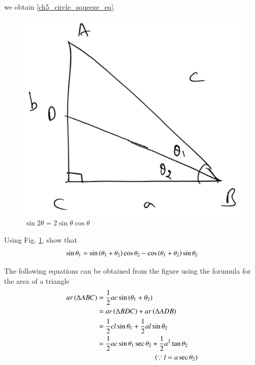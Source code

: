 %
we obtain \eqref{ch5_circle_squeeze_eq}.
%
\begin{figure}[!h]
	\begin{center}
		
		\includegraphics[width=\columnwidth]{./figs/ch5_sin_theta}
		\vspace*{-10cm}
	\end{center}
	\caption{$\sin2\theta = 2\sin\theta\cos\theta$}
	\label{ch5_sin_theta}	
\end{figure}
%
%
\begin{problem}
	Using Fig. \ref{ch5_sin_theta}, show that 
\begin{equation}
\label{ch5_sin_theta_eq}
\sin  \theta_1 = \sin \left(\theta_1 + \theta_2\right)\cos \theta_2 - \cos\left(\theta_1+\theta_2\right)\sin\theta_2
\end{equation}	
\end{problem}
\proof The following equations can be obtained from the figure using the forumula for the area of a triangle
%
\begin{align}
ar \left(\Delta ABC\right) &= \frac{1}{2}ac \sin\left(\theta_1 + \theta_2\right) \\
&= ar \left(\Delta BDC\right) + ar \left(\Delta ADB\right) \\
&= \frac{1}{2}cl \sin{\theta_1} + \frac{1}{2}al \sin{\theta_2} \\ 
\nonumber
&= \frac{1}{2}ac \sin{\theta_1} \sec \theta_2 + \frac{1}{2}a^2\tan{\theta_2} \\
&\qquad\qquad\qquad\qquad\left(\because
	l = a \sec \theta_2\right)
	\end{align}
